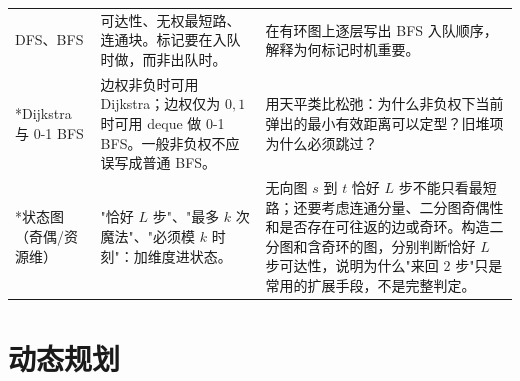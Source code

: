 \documentclass[a4paper,11pt]{article}
\begin{document}
\begin{longtable}{L{2.4cm} L{7.5cm} L{6.8cm}}
DFS、BFS
& 可达性、无权最短路、连通块。标记要在入队时做，而非出队时。
& 在有环图上逐层写出 BFS 入队顺序，解释为何标记时机重要。 \\[2mm]

*Dijkstra 与 0-1 BFS
& 边权非负时可用 Dijkstra；边权仅为 $0,1$ 时可用 deque 做 0-1 BFS。一般非负权不应误写成普通 BFS。
& 用天平类比松弛：为什么非负权下当前弹出的最小有效距离可以定型？旧堆项为什么必须跳过？ \\[2mm]

*状态图（奇偶/资源维）
& "恰好 $L$ 步"、"最多 $k$ 次魔法"、"必须模 $k$ 时刻"：加维度进状态。
& 无向图 $s$ 到 $t$ 恰好 $L$ 步不能只看最短路；还要考虑连通分量、二分图奇偶性和是否存在可往返的边或奇环。构造二分图和含奇环的图，分别判断恰好 $L$ 步可达性，说明为什么"来回 $2$ 步"只是常用的扩展手段，不是完整判定。 \\
\end{longtable}

\newpage
\section{动态规划}
\end{document}
